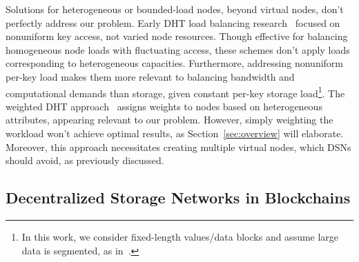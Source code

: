Solutions for heterogeneous or bounded-load nodes, beyond virtual nodes, don't perfectly address our problem.
Early DHT load balancing research~\cite{karger2004simple,misra2004clash} focused on nonuniform key access, not varied node resources.
Though effective for balancing homogeneous node loads with fluctuating access, these schemes don't apply loads corresponding to heterogeneous capacities.
Furthermore, addressing nonuniform per-key load makes them more relevant to balancing bandwidth and computational demands than storage, given constant per-key storage load\footnote{
    In this work, we consider fixed-length values/data blocks and assume large data is segmented, as in~\cite{benet2014ipfs}.
}.
The weighted DHT approach~\cite{schindelhauer2005weighted} assigns weights to nodes based on heterogeneous attributes, appearing relevant to our problem.
However, simply weighting the workload won't achieve optimal results, as Section~\ref{sec:overview} will elaborate.
Moreover, this approach necessitates creating multiple virtual nodes, which DSNs should avoid, as previously discussed.
 

\iffalse

\subsection{Decentralized Storage Networks in Blockchains}
\label{sec:bg:dsn}

